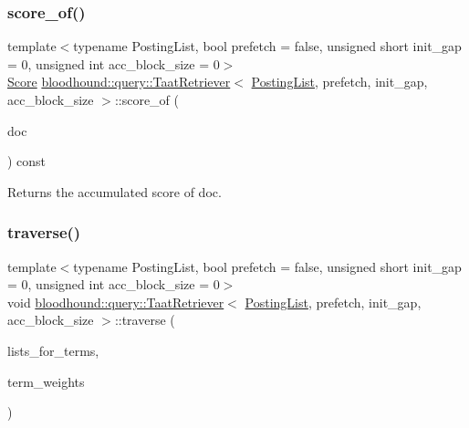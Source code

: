 \subsubsection{\texorpdfstring{score\+\_\+of()}{score\_of()}}
{\footnotesize\ttfamily template$<$typename Posting\+List, bool prefetch = false, unsigned short init\+\_\+gap = 0, unsigned int acc\+\_\+block\+\_\+size = 0$>$ \\
\hyperlink{structbloodhound_1_1Score}{Score} \hyperlink{classbloodhound_1_1query_1_1TaatRetriever}{bloodhound\+::query\+::\+Taat\+Retriever}$<$ \hyperlink{classbloodhound_1_1PostingList}{Posting\+List}, prefetch, init\+\_\+gap, acc\+\_\+block\+\_\+size $>$\+::score\+\_\+of (\begin{DoxyParamCaption}\item[{\hyperlink{structbloodhound_1_1Doc}{Doc}}]{doc }\end{DoxyParamCaption}) const\hspace{0.3cm}{\ttfamily [inline]}}



Returns the accumulated score of doc. 

\mbox{\label{classbloodhound_1_1query_1_1TaatRetriever_a1b476e4ada85862cb79a92b6424d2aa2}} 
\subsubsection{\texorpdfstring{traverse()}{traverse()}}
{\footnotesize\ttfamily template$<$typename Posting\+List, bool prefetch = false, unsigned short init\+\_\+gap = 0, unsigned int acc\+\_\+block\+\_\+size = 0$>$ \\
void \hyperlink{classbloodhound_1_1query_1_1TaatRetriever}{bloodhound\+::query\+::\+Taat\+Retriever}$<$ \hyperlink{classbloodhound_1_1PostingList}{Posting\+List}, prefetch, init\+\_\+gap, acc\+\_\+block\+\_\+size $>$\+::traverse (\begin{DoxyParamCaption}\item[{const std\+::vector$<$ \hyperlink{classbloodhound_1_1PostingList}{Posting\+List} $>$ \&}]{lists\+\_\+for\+\_\+terms,  }\item[{const std\+::vector$<$ \hyperlink{structbloodhound_1_1Score}{Score} $>$ \&}]{term\+\_\+weights }\end{DoxyParamCaption})\hspace{0.3cm}{\ttfamily [inline]}}



